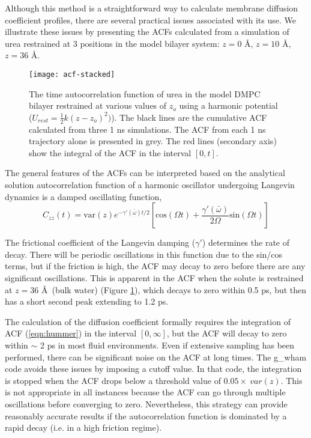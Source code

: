 Although this method is a straightforward way to calculate membrane diffusion coefficient profiles, there are several practical issues associated with its use. We illustrate these issues by presenting the ACFs calculated from a simulation of urea restrained at 3 positions in the model bilayer system: $z=0$ \AA,  $z=10$ \AA, $z=36$ \AA. 

\begin{figure}
\texttt{[image: acf-stacked]}
\caption{The time autocorrelation function of urea in the model DMPC bilayer restrained at various values of $z_o$ using a harmonic potential ($U_{rest}=\frac{1}{2}k(z-z_o)^2)$). The black lines are the cumulative ACF calculated from three 1 ns simulations. The ACF from each 1 ns trajectory alone is presented in grey. The red lines (secondary axis) show the integral of the ACF in the interval $[0,t]$.}
\label{fig:acf}
\end{figure}

The general features of the ACFs can be interpreted based on the analytical solution autocorrelation function of a harmonic oscillator undergoing Langevin dynamics is a damped oscillating function,\cite{Tuckerman2010}
\begin{equation}
C_{zz}(t) = \textrm{var}(z) e^{-\gamma'(\bar \omega)t/2}[ \textrm{cos}(\Omega t) + \frac{\gamma'(\bar \omega)}{2 \Omega} \textrm{sin}(\Omega t)]
\label{eq:analytical-acf}
\end{equation}

The frictional coefficient of the Langevin damping ($\gamma'$) determines the rate of decay. There will be periodic oscillations in this function due to the sin/cos terms, but if the friction is high, the ACF may decay to zero before there are any significant oscillations. This is apparent in the ACF when the solute is restrained at  $z=36$ \AA\ (bulk water) (Figure \ref{fig:acf}), which decays to zero within 0.5 ps, but then has a short second peak extending to 1.2 ps.

The calculation of the diffusion coefficient formally requires the integration of ACF (\ref{eqn:hummer}) in the interval $[0, \infty]$, but the ACF will  decay to zero within $\sim$ 2 ps in most fluid environments. Even if extensive sampling has been performed, there can be significant noise on the ACF at long times. The g\_wham code avoids these issues by imposing a cutoff value.\cite{gwham} In that code, the integration is stopped when the ACF drops below a threshold value of $0.05 \times\ var(z)$. This is not appropriate in all instances because the ACF can go through multiple oscillations before converging to zero. Nevertheless, this strategy can provide reasonably accurate results if the autocorrelation function is dominated by a rapid decay  (i.e. in a high friction regime).

